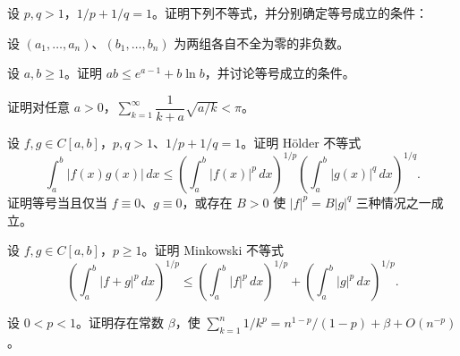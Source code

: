 \noindent\begin{minipage}{\textwidth}
设 $p,q>1$，$1/p+1/q=1$。证明下列不等式，并分别确定等号成立的条件：
\end{minipage}\par\vfill
\newpage
\noindent\begin{minipage}{\textwidth}
设 $(a_1,\ldots,a_n)$、$(b_1,\ldots,b_n)$ 为两组各自不全为零的非负数。
\end{minipage}\par\vfill
\noindent\begin{minipage}{\textwidth}
设 $a,b\ge1$。证明 $ab\le e^{a-1}+b\ln b$，并讨论等号成立的条件。
\end{minipage}\par\vfill
\noindent\begin{minipage}{\textwidth}
证明对任意 $a>0$，$\sum_{k=1}^{\infty}\dfrac1{k+a}\sqrt{a/k}<\pi$。
\end{minipage}\par\vfill
\newpage
\noindent\begin{minipage}{\textwidth}
设 $f,g\in C[a,b]$，$p,q>1$、$1/p+1/q=1$。证明 Hölder 不等式\[\int_a^b|f(x)g(x)|\,dx\le\left(\int_a^b|f(x)|^p\,dx\right)^{1/p}\left(\int_a^b|g(x)|^q\,dx\right)^{1/q}.\]证明等号当且仅当 $f\equiv0$、$g\equiv0$，或存在 $B>0$ 使 $|f|^p=B|g|^q$ 三种情况之一成立。
\end{minipage}\par\vfill
\noindent\begin{minipage}{\textwidth}
设 $f,g\in C[a,b]$，$p\ge1$。证明 Minkowski 不等式\[\left(\int_a^b|f+g|^p\,dx\right)^{1/p}\le\left(\int_a^b|f|^p\,dx\right)^{1/p}+\left(\int_a^b|g|^p\,dx\right)^{1/p}.\]
\end{minipage}\par\vfill
\noindent\begin{minipage}{\textwidth}
设 $0<p<1$。证明存在常数 $\beta$，使 $\sum_{k=1}^n1/k^p=n^{1-p}/(1-p)+\beta+O(n^{-p})$。
\end{minipage}\par\vfill
